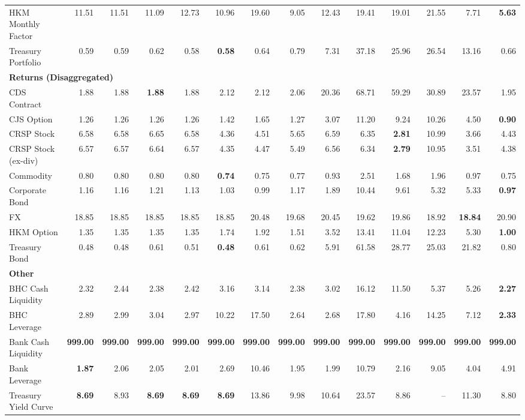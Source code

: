 \begin{table}[htbp]
\begin{tabular}{@{}lrrrrrrrrrrrrr@{}}
HKM Monthly Factor & 11.51 & 11.51 & 11.09 & 12.73 & 10.96 & 19.60 & 9.05 & 12.43 & 19.41 & 19.01 & 21.55 & 7.71 & \textbf{5.63} \\
Treasury Portfolio & 0.59 & 0.59 & 0.62 & 0.58 & \textbf{0.58} & 0.64 & 0.79 & 7.31 & 37.18 & 25.96 & 26.54 & 13.16 & 0.66 \\
\midrule
\multicolumn{14}{l}{\textbf{Returns (Disaggregated)}} \\
CDS Contract & 1.88 & 1.88 & \textbf{1.88} & 1.88 & 2.12 & 2.12 & 2.06 & 20.36 & 68.71 & 59.29 & 30.89 & 23.57 & 1.95 \\
CJS Option & 1.26 & 1.26 & 1.26 & 1.26 & 1.42 & 1.65 & 1.27 & 3.07 & 11.20 & 9.24 & 10.26 & 4.50 & \textbf{0.90} \\
CRSP Stock & 6.58 & 6.58 & 6.65 & 6.58 & 4.36 & 4.51 & 5.65 & 6.59 & 6.35 & \textbf{2.81} & 10.99 & 3.66 & 4.43 \\
CRSP Stock (ex-div) & 6.57 & 6.57 & 6.64 & 6.57 & 4.35 & 4.47 & 5.49 & 6.56 & 6.34 & \textbf{2.79} & 10.95 & 3.51 & 4.38 \\
Commodity & 0.80 & 0.80 & 0.80 & 0.80 & \textbf{0.74} & 0.75 & 0.77 & 0.93 & 2.51 & 1.68 & 1.96 & 0.97 & 0.75 \\
Corporate Bond & 1.16 & 1.16 & 1.21 & 1.13 & 1.03 & 0.99 & 1.17 & 1.89 & 10.44 & 9.61 & 5.32 & 5.33 & \textbf{0.97} \\
FX & 18.85 & 18.85 & 18.85 & 18.85 & 18.85 & 20.48 & 19.68 & 20.45 & 19.62 & 19.86 & 18.92 & \textbf{18.84} & 20.90 \\
HKM Option & 1.35 & 1.35 & 1.35 & 1.35 & 1.74 & 1.92 & 1.51 & 3.52 & 13.41 & 11.04 & 12.23 & 5.30 & \textbf{1.00} \\
Treasury Bond & 0.48 & 0.48 & 0.61 & 0.51 & \textbf{0.48} & 0.61 & 0.62 & 5.91 & 61.58 & 28.77 & 25.03 & 21.82 & 0.80 \\
\midrule
\multicolumn{14}{l}{\textbf{Other}} \\
BHC Cash Liquidity & 2.32 & 2.44 & 2.38 & 2.42 & 3.16 & 3.14 & 2.38 & 3.02 & 16.12 & 11.50 & 5.37 & 5.26 & \textbf{2.27} \\
BHC Leverage & 2.89 & 2.99 & 3.04 & 2.97 & 10.22 & 17.50 & 2.64 & 2.68 & 17.80 & 4.16 & 14.25 & 7.12 & \textbf{2.33} \\
Bank Cash Liquidity & \textbf{999.00} & \textbf{999.00} & \textbf{999.00} & \textbf{999.00} & \textbf{999.00} & \textbf{999.00} & \textbf{999.00} & \textbf{999.00} & \textbf{999.00} & \textbf{999.00} & \textbf{999.00} & \textbf{999.00} & \textbf{999.00} \\
Bank Leverage & \textbf{1.87} & 2.06 & 2.05 & 2.01 & 2.69 & 10.46 & 1.95 & 1.99 & 10.79 & 2.16 & 9.05 & 4.04 & 4.91 \\
Treasury Yield Curve & \textbf{8.69} & 8.93 & \textbf{8.69} & \textbf{8.69} & \textbf{8.69} & 13.86 & 9.98 & 10.64 & 23.57 & 8.86 & -- & 11.30 & 8.80 \\
\bottomrule
\end{tabular}
\vspace{0.1cm}

\end{table}
